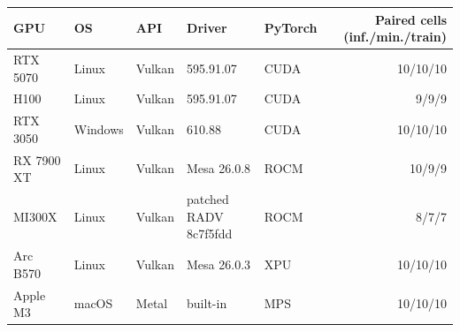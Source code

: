 \begin{tabular}{lllllr}
\toprule
GPU & OS & API & Driver & PyTorch & Paired cells (inf./min./train) \\
\midrule
RTX 5070 & Linux & Vulkan & 595.91.07 & CUDA & 10/10/10 \\
H100 & Linux & Vulkan & 595.91.07 & CUDA & 9/9/9 \\
RTX 3050 & Windows & Vulkan & 610.88 & CUDA & 10/10/10 \\
RX 7900 XT & Linux & Vulkan & Mesa 26.0.8 & ROCM & 10/9/9 \\
MI300X & Linux & Vulkan & patched RADV 8c7f5fdd & ROCM & 8/7/7 \\
Arc B570 & Linux & Vulkan & Mesa 26.0.3 & XPU & 10/10/10 \\
Apple M3 & macOS & Metal & built-in & MPS & 10/10/10 \\
\bottomrule
\end{tabular}
